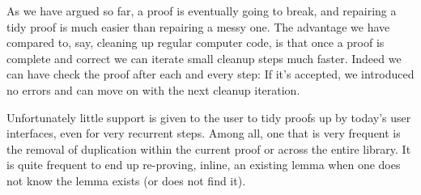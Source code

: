 As we have argued so far, a proof is eventually going to break, and repairing a
tidy proof is much easier than repairing a messy one.
The advantage we have compared to, say, cleaning up regular computer code, is
that once a proof is complete and correct we can iterate small cleanup steps
much faster. Indeed we can have \Coq{} check the proof after each and every
step: If it's accepted, we introduced no errors and can move on with the next
cleanup iteration.

Unfortunately little support is given to the user to tidy proofs up by today's
user interfaces, even for very recurrent steps.  Among all, one that is very
frequent is the removal of duplication within the current proof or across the
entire library.  It is quite frequent to end up re-proving, inline, an existing
lemma when one does not know the lemma exists (or does not find it).

% 
% 
% 
% 
% 
% 
% 
% 
% 
% 
